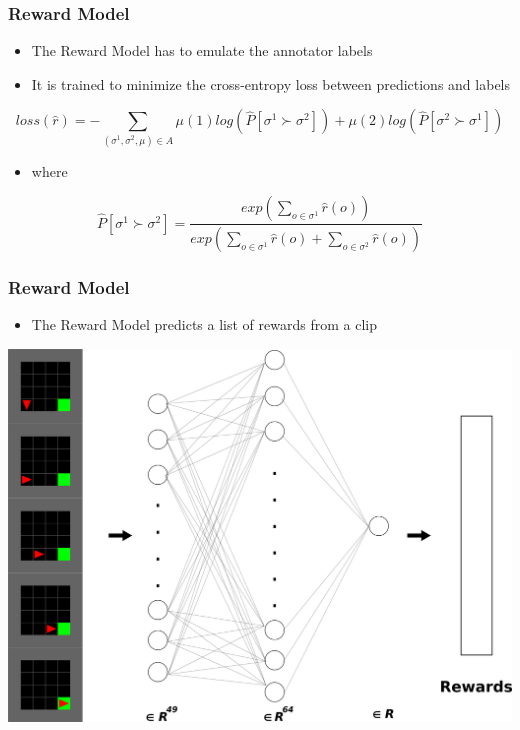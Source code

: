 \begin{frame}
\frametitle{Reward Model}
\begin{itemize}
    \item The Reward Model has to emulate the annotator labels
    \item It is trained to minimize the cross-entropy loss between predictions and labels
\end{itemize}

\vspace{0.2cm}

\begin{equation*}
    loss(\hat{r}) = - \sum_{(\sigma^1,\sigma^2,\mu)\in A} \mu(1)log(\hat{P}[\sigma^1 \succ \sigma^2]) + \mu(2)log(\hat{P}[\sigma^2 \succ \sigma^1])
\end{equation*}

\begin{itemize}
    \item where
\end{itemize}

\begin{equation*}
    \hat{P}[\sigma^1 \succ \sigma^2] = \frac{exp(\sum_{o \in \sigma^1} \hat{r}(o))}{exp(\sum_{o \in \sigma^1} \hat{r}(o) + \sum_{o \in \sigma^2} \hat{r}(o))}
\end{equation*}



\end{frame}


\begin{frame}
\frametitle{Reward Model}
\begin{itemize}
    \item The Reward Model predicts a list of rewards from a clip
\end{itemize}
\vspace{0.3cm}
\centering
\includegraphics[width=0.55\linewidth]{images/reward.png}
\end{frame}



